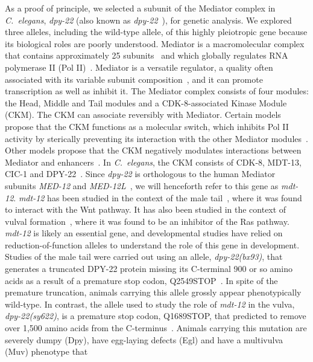 \documentclass[10pt, twocolumn]{article}
\newcommand{\cel}{\emph{C.~elegans}}
\newcommand{\gene}[1]{\mbox{\emph{#1}}}
\newcommand{\protein}[1]{\mbox{\uppercase{#1}}}
\newcommand{\dpy}{\gene{mdt-12}}
\begin{document}
As a proof of principle, we selected a subunit of the Mediator complex in
\cel{}, \gene{dpy-22} (also known as \gene{dpy-22}~\cite{}), for genetic analysis.
We explored three alleles, including the wild-type allele, of this highly
pleiotropic gene because its biological roles are poorly understood. Mediator is
a macromolecular complex that contains approximately 25
subunits~\cite{Jeronimo2017} and which globally regulates RNA polymerase II (Pol
II)~\cite{Allen2015,Takagi2006}. Mediator is a versatile regulator, a quality
often associated with its variable subunit composition~\cite{Allen2015}, and it
can promote transcription as well as inhibit it. The Mediator complex consists
of four modules: the Head, Middle and Tail modules and a CDK-8-associated Kinase
Module (CKM). The CKM can associate reversibly with Mediator. Certain models
propose that the CKM functions as a molecular switch, which inhibits Pol II
activity by sterically preventing its interaction with the other Mediator
modules~\cite{Knuesel2009,Elmlund2006}. Other models propose that the CKM
negatively modulates interactions between Mediator and
enhancers~\cite{VandePeppel2005}. In \cel{}, the CKM consists of
\protein{cdk-8}, \protein{mdt-13}, \protein{cic-1} and
\protein{DPY-22}~\cite{Grants2015}. Since \gene{dpy-22} is orthologous to the
human Mediator subunits \gene{MED-12} and \gene{MED-12L}~\cite{Zhang2000}, we
will henceforth refer to this gene as \dpy{}.  \dpy{} has been studied in the context of the male
tail~\cite{Zhang2000}, where it was found to interact with the Wnt pathway. It
has also been studied in the context of vulval formation~\cite{Moghal2003a},
where it was found to be an inhibitor of the Ras pathway. \dpy{} is likely an
essential gene, and developmental studies have relied on reduction-of-function
alleles to understand the role of this gene in development. Studies of the male
tail were carried out using an allele, \gene{dpy-22(bx93)}, that generates a
truncated \protein{dpy-22} protein missing its C-terminal 900 or so amino acids
as a result of a premature stop codon, Q2549STOP~\cite{Zhang2000}. In spite of
the premature truncation, animals carrying this allele grossly appear
phenotypically wild-type. In contrast, the allele used to study the role of
\dpy{} in the vulva, \gene{dpy-22(sy622)}, is a premature stop codon, Q1689STOP,
that predicted to remove over 1,500 amino acids from the
C-terminus~\cite{Moghal2003}. Animals carrying this mutation are severely dumpy
(Dpy), have egg-laying defects (Egl) and have a multivulva (Muv) phenotype that
\end{document}

